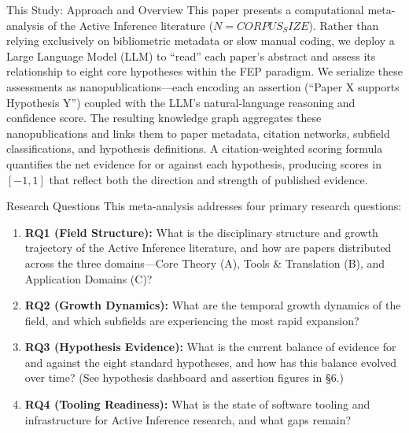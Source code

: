 \documentclass[
  ignorenonframetext,
]{beamer}
\providecommand{\tightlist}{%
  \setlength{\itemsep}{0pt}\setlength{\parskip}{0pt}}
\begin{document}
\begin{frame}{This Study: Approach and Overview}
\protect{}\label{this-study-approach-and-overview}
This paper presents a computational meta-analysis of the Active
Inference literature (\(N = {{CORPUS_SIZE}}\)). Rather than relying
exclusively on bibliometric metadata or slow manual coding, we deploy a
Large Language Model (LLM) to ``read'' each paper's abstract and assess
its relationship to eight core hypotheses within the FEP paradigm. We
serialize these assessments as nanopublications---each encoding an
assertion (``Paper X supports Hypothesis Y'') coupled with the LLM's
natural-language reasoning and confidence score. The resulting knowledge
graph aggregates these nanopublications and links them to paper
metadata, citation networks, subfield classifications, and hypothesis
definitions. A citation-weighted scoring formula quantifies the net
evidence for or against each hypothesis, producing scores in \([-1, 1]\)
that reflect both the direction and strength of published evidence.
\end{frame}

\begin{frame}{Research Questions}
\protect{}\label{research-questions}
This meta-analysis addresses four primary research questions:

\begin{enumerate}
\tightlist
\item
  \textbf{RQ1 (Field Structure):} What is the disciplinary structure and
  growth trajectory of the Active Inference literature, and how are
  papers distributed across the three domains---Core Theory (A), Tools
  \& Translation (B), and Application Domains (C)?
\item
  \textbf{RQ2 (Growth Dynamics):} What are the temporal growth dynamics
  of the field, and which subfields are experiencing the most rapid
  expansion?
\item
  \textbf{RQ3 (Hypothesis Evidence):} What is the current balance of
  evidence for and against the eight standard hypotheses, and how has
  this balance evolved over time? (See hypothesis dashboard and
  assertion figures in §6.)
\item
  \textbf{RQ4 (Tooling Readiness):} What is the state of software
  tooling and infrastructure for Active Inference research, and what
  gaps remain?
\end{enumerate}
\end{frame}
\end{document}
